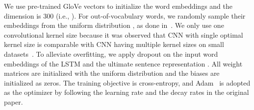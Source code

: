 \documentclass[11pt,a4paper]{article}
\begin{document}
We use pre-trained GloVe vectors \cite{pennington2014glove} to initialize the word embeddings and the dimension is 300 (i.e., ). For out-of-vocabulary words, we randomly sample their embeddings from the uniform distribution , as done in~\cite{kim:2014:EMNLP2014}. 
We only use one convolutional kernel size because it was observed that CNN with single optimal kernel size is comparable with CNN having multiple kernel sizes on small datasets~\cite{zhang-wallace:2017:I17-1}. To alleviate overfitting, we apply dropout on the input word embeddings of the LSTM and the ultimate sentence representation . All weight matrices are initialized with the uniform distribution  and the biases are initialized as zeros. The training objective is cross-entropy, and Adam~\cite{kingma2014adam} is adopted as the optimizer by following the learning rate and the decay rates in the original paper. 
\end{document}
